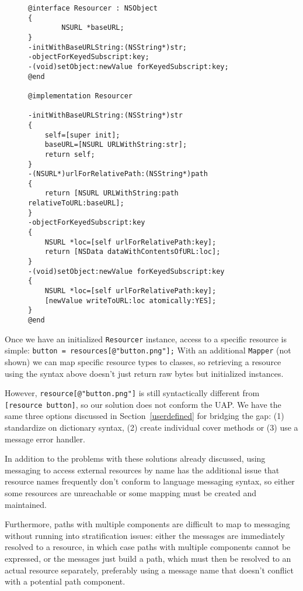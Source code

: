 \documentclass[preprint]{sigplanconf}
\begin{document}
\begin{figure}[htbp]
\begin{lstlisting}[style=numbers,label=resourcer,caption=Resourcer implementation]
@interface Resourcer : NSObject
{
        NSURL *baseURL;
}
-initWithBaseURLString:(NSString*)str;
-objectForKeyedSubscript:key;
-(void)setObject:newValue forKeyedSubscript:key;
@end

@implementation Resourcer

-initWithBaseURLString:(NSString*)str
{
    self=[super init];
    baseURL=[NSURL URLWithString:str];
    return self;
}
-(NSURL*)urlForRelativePath:(NSString*)path
{
    return [NSURL URLWithString:path relativeToURL:baseURL];
}
-objectForKeyedSubscript:key
{
    NSURL *loc=[self urlForRelativePath:key];
    return [NSData dataWithContentsOfURL:loc];
}
-(void)setObject:newValue forKeyedSubscript:key
{
    NSURL *loc=[self urlForRelativePath:key];
    [newValue writeToURL:loc atomically:YES];
}
@end
\end{lstlisting}
\end{figure}

Once we have an initialized {\tt Resourcer} instance, access to a specific resource
is  simple:   {\tt button = resources[@"button.png"];}   With an additional {\tt Mapper}
(not shown) we can map specific resource types to classes, so retrieving a 
resource using the syntax above doesn't just return raw bytes but initialized 
instances.  

However, {\tt resource[@"button.png"]} is still syntactically different from {\tt [resource button]},
so our solution does not conform the UAP.   We have the same three options  discussed
in Section~\ref{userdefined} for bridging
the gap:  (1) standardize on dictionary syntax, (2) create individual cover methods or
(3) use a message error handler.  

In addition to the problems with these solutions already discussed,
using messaging to access external resources by name has the additional issue that 
resource names frequently don't conform to language messaging syntax, so either
some resources are unreachable or some mapping must be created and maintained.

Furthermore, paths with multiple components are difficult to map to messaging without
running into stratification issues:  either the messages are immediately resolved to
a resource, in which case paths with multiple components cannot be expressed, or
the messages just build a path, which must then be resolved to an actual resource
separately, preferably using a message name that doesn't conflict with a potential
path component. 
\end{document}
